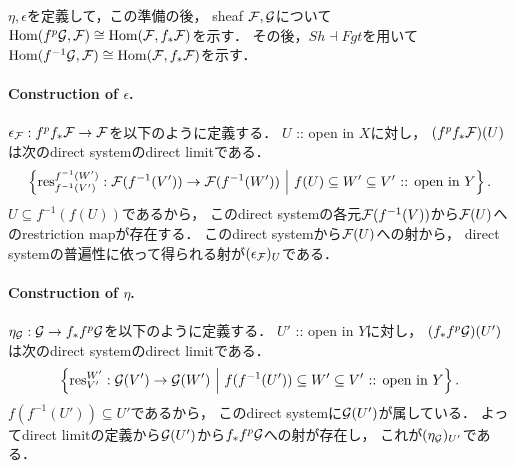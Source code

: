 \documentclass[a4paper]{jsarticle}
\newcommand{\ftorSh}{\mathit{Sh}}
\newcommand{\ftorFgt}{\mathit{Fgt}}
\begin{document}
    $\eta, \epsilon$を定義して，この準備の後，
    sheaf $\mathcal{F}, \mathcal{G}$について$\operatorname{Hom}(f^p\mathcal{G}, \mathcal{F}) \cong \operatorname{Hom}(\mathcal{F}, f_*\mathcal{F})$を示す．
    その後，$\ftorSh \dashv \ftorFgt$を用いて
    $\operatorname{Hom}(f^{-1}\mathcal{G}, \mathcal{F}) \cong \operatorname{Hom}(\mathcal{F}, f_*\mathcal{F})$を示す．

    \paragraph{Construction of $\epsilon$.}
    $\epsilon_{\mathcal{F}}: f^pf_* \mathcal{F} \to \mathcal{F}$を以下のように定義する．
    $U$ :: open in $X$に対し，
    $(f^pf_* \mathcal{F})(U)$は次のdirect systemのdirect limitである．
    \[
        \left\{
            \operatorname{res}_{f^{-1}(V')}^{f^{-1}(W')}: \mathcal{F}(f^{-1}(V')) \to \mathcal{F}(f^{-1}(W'))
            ~\middle|~
            f(U) \subseteq W' \subseteq V' \text{ :: open in } Y
        \right\}.
    \]
    $U \subseteq f^{-1}(f(U))$であるから，
    このdirect systemの各元$\mathcal{F}(f^{-1}(V))$から$\mathcal{F}(U)$へのrestriction mapが存在する．
    このdirect systemから$\mathcal{F}(U)$への射から，
    direct systemの普遍性に依って得られる射が$(\epsilon_{\mathcal{F}})_U$である．

    \paragraph{Construction of $\eta$.}
    $\eta_{\mathcal{G}}: \mathcal{G} \to f_*f^p\mathcal{G}$を以下のように定義する．
    $U'$ :: open in $Y$に対し，
    $(f_*f^p \mathcal{G})(U')$は次のdirect systemのdirect limitである．
    \[
        \left\{
            \operatorname{res}_{V'}^{W'}: \mathcal{G}(V') \to \mathcal{G}(W')
            ~\middle|~
            f(f^{-1}(U')) \subseteq W' \subseteq V' \text{ :: open in } Y
        \right\}.
    \]
    $f(f^{-1}(U')) \subseteq U'$であるから，
    このdirect systemに$\mathcal{G}(U')$が属している．
    よってdirect limitの定義から$\mathcal{G}(U')$から$f_*f^p\mathcal{G}$への射が存在し，
    これが$(\eta_{\mathcal{G}})_{U'}$である．
\end{document}
